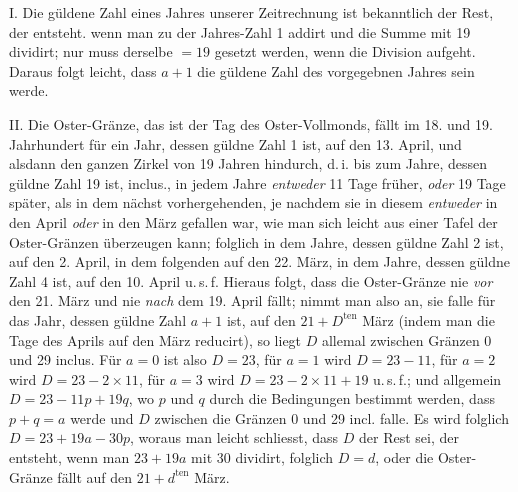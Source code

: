 I. Die güldene Zahl eines Jahres unserer Zeitrechnung ist bekanntlich der
Rest, der entsteht. wenn man zu der Jahres-Zahl 1 addirt und die Summe mit 19
dividirt; nur muss derselbe $=19$ gesetzt werden, wenn die Division aufgeht.
Daraus folgt leicht, dass $a+1$ die güldene Zahl des vorgegebnen Jahres sein werde.

II. Die Oster-Gränze, das ist der Tag des Oster-Vollmonds, fällt im 18.
und 19. Jahrhundert für ein Jahr, dessen güldne Zahl 1 ist, auf den 13. April,
und alsdann den ganzen Zirkel von 19 Jahren hindurch, d.\,i. bis zum Jahre,
dessen güldne Zahl 19 ist, inclus., in jedem Jahre \textit{entweder} 11 Tage früher, \textit{oder}
19 Tage später, als in dem nächst vorhergehenden, je nachdem sie in diesem
\textit{entweder} in den April \textit{oder} in den März gefallen war, wie man sich leicht aus einer
Tafel der Oster-Gränzen überzeugen kann; folglich in dem Jahre, dessen
güldne Zahl 2 ist, auf den 2. April, in dem folgenden auf den 22. März, in dem
Jahre, dessen güldne Zahl 4 ist, auf den 10. April u.\,s.\,f. Hieraus folgt, dass
die Oster-Gränze nie \textit{vor} den 21. März und nie \textit{nach} dem 19. April fällt; nimmt
man also an, sie falle für das Jahr, dessen güldne Zahl $a+1$ ist, auf den
$21+D^{\mathrm{ten}}$ März (indem man die Tage des Aprils auf den März reducirt), so liegt
$D$ allemal zwischen Gränzen 0 und 29 inclus. Für $a=0$ ist also $D=23$,
für $a=1$ wird $D=23-11$, für $a=2$ wird $D=23-2\times11$, für $a=3$
wird $D=23-2\times11+19$ u.\,s.\,f.; und allgemein $D=23-11p+19q$, wo $p$
und $q$ durch die Bedingungen bestimmt werden, dass $p+q=a$ werde und $D$
zwischen die Gränzen 0 und 29 incl. falle. Es wird folglich $D=23+19a-30p$,
woraus man leicht schliesst, dass $D$ der Rest sei, der entsteht, wenn man
$23+19a$ mit 30 dividirt, folglich $D=d$, oder die Oster-Gränze fällt auf den
$21+d^{\mathrm{ten}}$ März.

